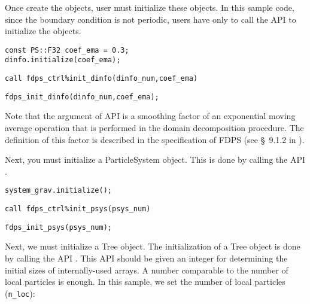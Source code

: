 Once create the objects, user must initialize these objects. In this sample code, since the boundary condition is not periodic, users have only to call the API  to initialize the objects.

\ifCpp %
\begin{lstlisting}[caption=Initialization of \textsf{DomainInfo} object]
const PS::F32 coef_ema = 0.3;
dinfo.initialize(coef_ema);
\end{lstlisting}
\endifCpp
\ifFtn %
\begin{lstlisting}[caption=Initialization of \textsf{DomainInfo} object]
call fdps_ctrl%init_dinfo(dinfo_num,coef_ema)
\end{lstlisting}
\endifFtn
\ifC %
\begin{lstlisting}[caption=Initialization of \textsf{DomainInfo} object]
fdps_init_dinfo(dinfo_num,coef_ema);
\end{lstlisting}
\endifC
Note that the  argument of API  is a smoothing factor of an exponential moving average operation that is performed in the domain decomposition procedure. The definition of this factor is described in the specification of FDPS (see \S~9.1.2 in ).


Next, you must initialize a \textsf{ParticleSystem} object. This is done by calling the API .

\ifCpp %
\begin{lstlisting}[caption=Initialization of \textsf{ParticleSystem} object]
system_grav.initialize();
\end{lstlisting}
\endifCpp
\ifFtn %
\begin{lstlisting}[caption=Initialization of \textsf{ParticleSystem} object]
call fdps_ctrl%init_psys(psys_num)
\end{lstlisting}
\endifFtn
\ifC %
\begin{lstlisting}[caption=Initialization of \textsf{ParticleSystem} object]
fdps_init_psys(psys_num);
\end{lstlisting}
\endifC


Next, we must initialize a \textsf{Tree} object. The initialization of a \textsf{Tree} object is done by calling the API \initTree . This API should be given an integer for determining the initial sizes of internally-used arrays. A number comparable to the number of local particles is enough. In this sample, we set the number of local particles (\texttt{n\_loc}):

